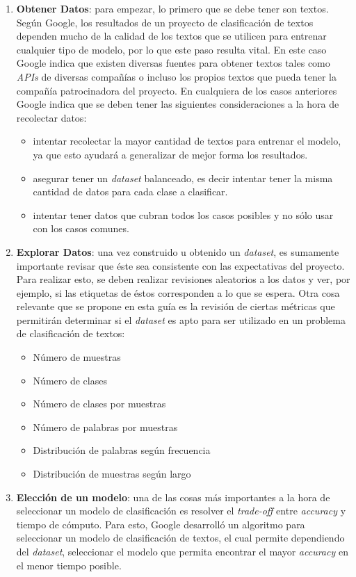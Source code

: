     \begin{enumerate}
        \item \textbf{Obtener Datos}: para empezar, lo primero que se debe tener son textos. Según Google, los resultados de un proyecto de clasificación de textos dependen mucho de la calidad de los textos que se utilicen para entrenar cualquier tipo de modelo, por lo que este paso resulta vital.  En este caso Google indica que existen diversas fuentes para obtener textos tales como \textit{APIs} de diversas compañías o incluso los propios textos que pueda tener la compañía patrocinadora del proyecto. En cualquiera de los casos anteriores Google indica que se deben tener las siguientes consideraciones a la hora de recolectar datos:
        \begin{itemize}
            \item intentar recolectar la mayor cantidad de textos para entrenar el modelo, ya que esto ayudará a generalizar de mejor forma los resultados.
            \item asegurar tener un \textit{dataset} balanceado, es decir intentar tener la misma cantidad de datos para cada clase a clasificar.
            \item intentar tener datos que cubran todos los casos posibles y no sólo usar con los casos comunes. 
        \end{itemize}
       \item \textbf{Explorar Datos}: una vez construido u obtenido un \textit{dataset}, es sumamente importante revisar que éste sea consistente con las expectativas del proyecto. Para realizar esto, se deben realizar revisiones aleatorios a los datos y ver, por ejemplo, si las etiquetas de éstos corresponden a lo que se espera.
       Otra cosa relevante que se propone en esta guía es la revisión de ciertas métricas que permitirán determinar si el \textit{dataset} es apto para ser utilizado en un problema de clasificación de textos:
       \begin{itemize}
           \item Número de muestras
           \item Número de clases
           \item Número de clases por muestras
           \item Número de palabras por muestras
           \item Distribución de palabras según frecuencia
           \item Distribución de muestras según largo
       \end{itemize}   
      \item \textbf{Elección de un modelo}: una de las cosas más importantes a la hora de seleccionar un modelo de clasificación es resolver el \textit{trade-off} entre \textit{accuracy} y tiempo de cómputo. Para esto, Google desarrolló un algoritmo para seleccionar un modelo de clasificación de textos, el cual permite dependiendo del \textit{dataset}, seleccionar el modelo que permita encontrar el mayor \textit{accuracy} en el menor tiempo posible. 


\end{enumerate}

